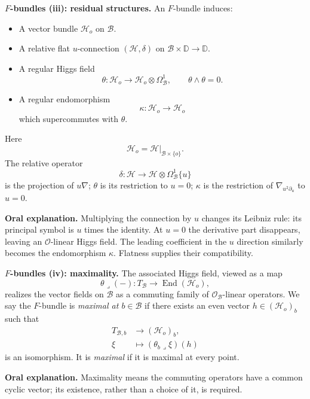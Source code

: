 \medskip\noindent
\textbf{$F$-bundles (iii): residual
structures.}
An $F$-bundle induces:
\begin{itemize}
\item A vector bundle $\mathcal H_o$ on
$\mathcal B$.
\item A relative flat $u$-connection
$(\mathcal H,\delta)$ on
$\mathcal B\times\mathbb D\to\mathbb D$.
\item A regular Higgs field
$$
\theta:\mathcal H_o\longrightarrow
\mathcal H_o\otimes\Omega^1_{\mathcal B},
\qquad \theta\wedge\theta=0.
$$
\item A regular endomorphism
$$
\kappa:\mathcal H_o\longrightarrow
\mathcal H_o
$$
which supercommutes with $\theta$.
\end{itemize}
Here
$$
\mathcal H_o=
\mathcal H|_{\mathcal B\times\{o\}}.
$$
The relative operator
$$
\delta:\mathcal H\longrightarrow
\mathcal H\otimes\Omega^1_{\mathcal B}\{u\}
$$
is the projection of $u\nabla$;
$\theta$ is its restriction to $u=0$;
$\kappa$ is the restriction of
$\nabla_{u^2\partial_u}$ to $u=0$.

\medskip\noindent
\textbf{Oral explanation.}
Multiplying the connection by $u$ changes
its Leibniz rule: its principal symbol is
$u$ times the identity. At $u=0$ the
derivative part disappears, leaving an
$\mathcal O$-linear Higgs field. The leading
coefficient in the $u$ direction similarly
becomes the endomorphism $\kappa$.
Flatness supplies their compatibility.

\medskip\noindent
\textbf{$F$-bundles (iv): maximality.}
The associated Higgs field, viewed as a map
$$
\theta\mathbin{\lrcorner}(-):
T_{\mathcal B}\longrightarrow
\operatorname{End}(\mathcal H_o),
$$
realizes the vector fields on $\mathcal B$
as a commuting family of
$\mathcal O_{\mathcal B}$-linear operators.
We say the $F$-bundle is \emph{maximal at
$b\in\mathcal B$} if there exists an even
vector $h\in(\mathcal H_o)_b$ such that
$$
\begin{aligned}
T_{\mathcal B,b}&\longrightarrow
(\mathcal H_o)_b,\\
\xi&\longmapsto
(\theta_b\mathbin{\lrcorner}\xi)(h)
\end{aligned}
$$
is an isomorphism. It is \emph{maximal} if
it is maximal at every point.

\textbf{Oral explanation.}
Maximality means the commuting operators
have a common cyclic vector; its existence,
rather than a choice of it, is required.

